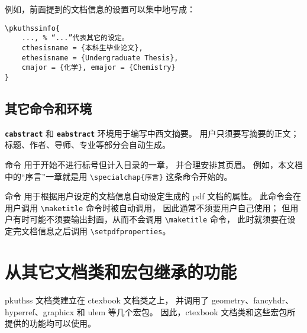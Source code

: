 例如，前面提到的文档信息的设置可以集中地写成：
\begin{Verbatim}
\pkuthssinfo{
	..., % “...”代表其它的设定。
	cthesisname = {本科生毕业论文},
	ethesisname = {Undergraduate Thesis},
	cmajor = {化学}, emajor = {Chemistry}
}
\end{Verbatim}

\subsection{其它命令和环境}\label{ssec:misc}

\texttt{\bfseries cabstract} 和 \texttt{\bfseries eabstract}
环境用于编写中西文摘要。
用户只须要写摘要的正文；标题、作者、导师、专业等部分会自动生成。

\texttt{\bfseries\string\specialchap} 命令
用于开始不进行标号但计入目录的一章，
并合理安排其页眉。%
例如，本文档中的“序言”一章就是用 \verb|\specialchap{序言}|
这条命令开始的。%

\texttt{\bfseries\string\setpdfproperties} 命令
用于根据用户设定的文档信息自动设定生成的 pdf 文档的属性。
此命令会在用户调用 \verb|\maketitle| 命令时被自动调用，
因此通常不须要用户自己使用；
但用户有时可能不须要输出封面，从而不会调用 \verb|\maketitle| 命令，
此时就须要在设定完文档信息之后调用 \verb|\setpdfproperties|。%

\section{从其它文档类和宏包继承的功能}\label{sec:thirdparty}

pkuthss 文档类建立在 ctexbook 文档类之上，
并调用了 geometry、fancyhdr、%
hyperref、graphicx
和 ulem 等几个宏包。
因此，ctexbook 文档类和这些宏包所提供的功能均可以使用。

